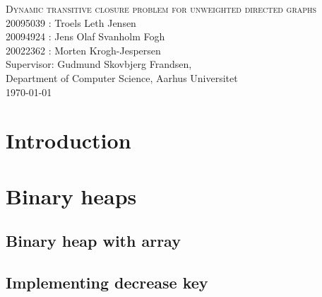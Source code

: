 \documentclass[12pt,a4paper,twoside,danish,article]{memoir}
\begin{document}
\frontmatter
\begin{titlingpage}
  \begin{center}
    \mbox{}\vfill
    \Huge{\textsc{Dynamic transitive closure problem for unweighted directed graphs}} \\
    \vspace{3cm}
    \Large{20095039 : Troels Leth Jensen \\ 20094924 : Jens Olaf Svanholm Fogh \\ 20022362 : Morten Krogh-Jespersen}\\
    \vspace{10cm}
    \vspace{1cm}
    Supervisor: Gudmund Skovbjerg Frandsen,\\ Department of Computer Science, Aarhus Universitet\\
    \today
    \vfill
    \vfill\mbox{}
  \end{center}
  \clearpage
  \tableofcontents*
\end{titlingpage}

\mainmatter

\raggedbottom

\renewcommand{\labelitemi}{$\bullet$}

\renewcommand{\baselinestretch}{1.2}\normalsize %

\renewcommand{\chaptermark}[1]{\markboth{\thechapter.
    #1}{\thechapter. #1}} %
\renewcommand{\bibmark}{\markboth{\bibname}{\bibname}} %
\renewcommand{\tocmark}{\markboth{\contentsname}{\contentsname}}

\setlength{\parindent}{10pt} 

\chapter{Introduction}

\chapter{Binary heaps}

\section{Binary heap with array}

\section{Implementing decrease key}
\end{document}
